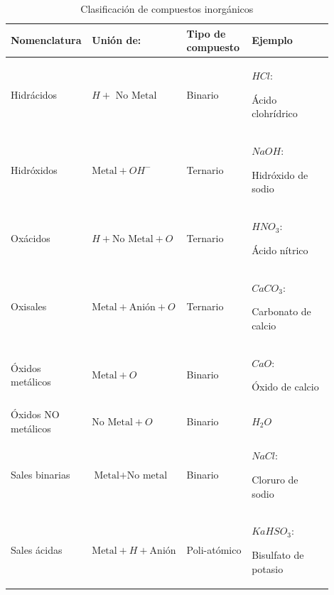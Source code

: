 \begin{table}[H]
\centering

\caption{Clasificación de compuestos inorgánicos}
\label{tab:nomenclatura_compuestos}

{\small{}

\begin{tabular}{m{0.2\linewidth}m{0.25\linewidth}m{0.2\linewidth}m{0.25\linewidth}} \hline

    \bfseries{Nomenclatura} & \bfseries{Unión de:} & \bfseries{Tipo de compuesto} & \bfseries{Ejemplo} \\ \hline
    
    Hidrácidos          & $H + \text{ No Metal}$            & Binario      & $HCl$:     \par Ácido clohrídrico    \\
    Hidróxidos          & $\text{Metal} + OH^{-}$           & Ternario     & $NaOH$:    \par Hidróxido de sodio   \\
    Oxácidos            & $H + \text{No Metal} + O$         & Ternario     & $HNO_3$:   \par Ácido nítrico        \\
    Oxisales            & $\text{Metal} + \text{Anión} + O$ & Ternario     & $CaCO_3$:  \par Carbonato de calcio  \\
    Óxidos metálicos    & $\text{Metal} + O$                & Binario      & $CaO$:     \par Óxido de calcio      \\
    Óxidos NO metálicos & $\text{No Metal} + O$             & Binario      & $H_{2}O$                             \\
    Sales binarias      & $\text{Metal} + \text{No metal}$  & Binario      & $NaCl$:    \par Cloruro de sodio     \\
    Sales ácidas        & $\text{Metal} + H + \text{Anión}$ & Poli-atómico & $KaHSO_3$: \par Bisulfato de potasio \\
    
    \hline
\end{tabular}}\end{table}